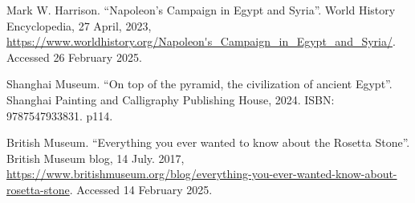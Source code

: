 \documentclass[b5paper]{article}
\begin{document}
\begin{thebibliography}{99}

Mark W. Harrison. ``Napoleon's Campaign in Egypt and Syria''. World History Encyclopedia, 27 April, 2023, \url{https://www.worldhistory.org/Napoleon's_Campaign_in_Egypt_and_Syria/}. Accessed 26 February 2025.

Shanghai Museum. ``On top of the pyramid, the civilization of ancient Egypt''. Shanghai Painting and Calligraphy Publishing House, 2024. ISBN: 9787547933831. p114.

British Museum. ``Everything you ever wanted to know about the Rosetta Stone''. British Museum blog, 14 July. 2017, \url{https://www.britishmuseum.org/blog/everything-you-ever-wanted-know-about-rosetta-stone}. Accessed 14 February 2025.




\end{thebibliography}

\expandafter\enddocument

\fi
\end{document}
